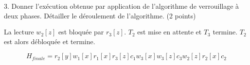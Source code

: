 3. Donner l'exécution obtenue 
par application de l'algorithme de verrouillage à deux phases. 
Détailler le déroulement de l'algorithme. 
 (2 points)

\begin{solution}
La lecture $w_2[z]$ est bloquée par $r_3[z]$. $T_2$ est mise en attente et $T_3$ termine. $T_2$
est alors débloquée et termine.

$$H_{finale} = r_2[y] w_1[x] r_1[x] r_3[z] c_1 w_3[x] w_3[z] c_3 w_2[z] r_2[x] c_2$$
\end{solution}



